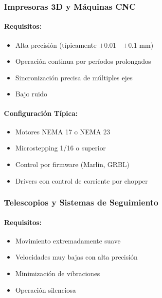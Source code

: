 \subsubsection{Impresoras 3D y Máquinas CNC}

\paragraph{Requisitos:}

\begin{itemize}
    \item Alta precisión (típicamente $\pm 0.01$ - $\pm 0.1$ mm)
    \item Operación continua por períodos prolongados
    \item Sincronización precisa de múltiples ejes
    \item Bajo ruido
\end{itemize}

\paragraph{Configuración Típica:}

\begin{itemize}
    \item Motores NEMA 17 o NEMA 23
    \item Microstepping 1/16 o superior
    \item Control por firmware (Marlin, GRBL)
    \item Drivers con control de corriente por chopper
\end{itemize}

\subsubsection{Telescopios y Sistemas de Seguimiento}

\paragraph{Requisitos:}

\begin{itemize}
    \item Movimiento extremadamente suave
    \item Velocidades muy bajas con alta precisión
    \item Minimización de vibraciones
    \item Operación silenciosa
\end{itemize}

